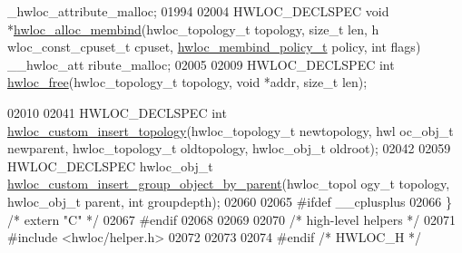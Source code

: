 \begin{DoxyCode}
      \_hwloc\_attribute\_malloc;
01994 
02004 HWLOC\_DECLSPEC \textcolor{keywordtype}{void} *\hyperlink{a00050_ga221a7edc5d436300374fa16463f607e5}{hwloc_alloc_membind}(hwloc\_topology\_t topology, \textcolor{keywordtype}{size\_t} len, h
      wloc\_const\_cpuset\_t cpuset, \hyperlink{a00050_gac9764f79505775d06407b40f5e4661e8}{hwloc_membind_policy_t} policy, \textcolor{keywordtype}{int} flags) \_\_hwloc\_att
      ribute\_malloc;
02005 
02009 HWLOC\_DECLSPEC \textcolor{keywordtype}{int} \hyperlink{a00050_ga986d9b4cc76da592c4b937c6cb7d9d56}{hwloc_free}(hwloc\_topology\_t topology, \textcolor{keywordtype}{void} *addr, \textcolor{keywordtype}{size\_t} len);
      
02010 
02041 HWLOC\_DECLSPEC \textcolor{keywordtype}{int} \hyperlink{a00051_ga59ccf6a63cb23d63940e8b782059d9cb}{hwloc_custom_insert_topology}(hwloc\_topology\_t newtopology, hwl
      oc\_obj\_t newparent, hwloc\_topology\_t oldtopology, hwloc\_obj\_t oldroot);
02042 
02059 HWLOC\_DECLSPEC hwloc\_obj\_t \hyperlink{a00051_gac1037fe389bfa7c2bf0e3739b7e20844}{hwloc_custom_insert_group_object_by_parent}(hwloc\_topol
      ogy\_t topology, hwloc\_obj\_t parent, \textcolor{keywordtype}{int} groupdepth);
02060 
02065 \textcolor{preprocessor}{#ifdef \_\_cplusplus}
02066 \textcolor{preprocessor}{}\} \textcolor{comment}{/* extern "C" */}
02067 \textcolor{preprocessor}{#endif}
02068 \textcolor{preprocessor}{}
02069 
02070 \textcolor{comment}{/* high-level helpers */}
02071 \textcolor{preprocessor}{#include <hwloc/helper.h>}
02072 
02073 
02074 \textcolor{preprocessor}{#endif }\textcolor{comment}{/* HWLOC\_H */}
\end{DoxyCode}
